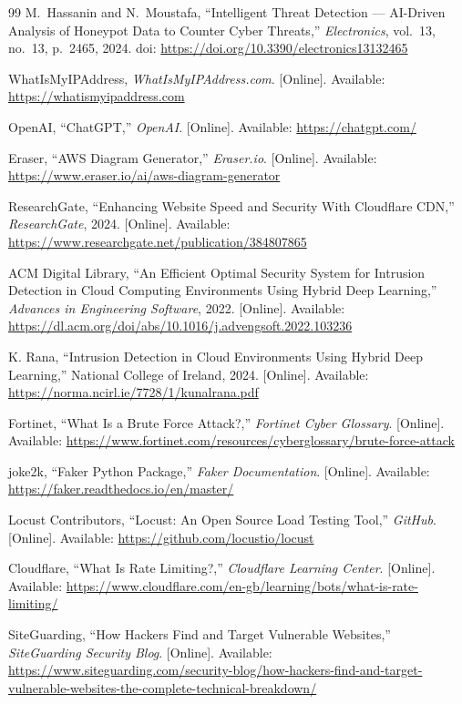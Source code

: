 \documentclass[12pt, a4paper]{report}   %
\begin{document}
\begin{thebibliography}{99}
M.~Hassanin and N.~Moustafa,
``Intelligent Threat Detection --- {AI}-Driven Analysis of Honeypot
Data to Counter Cyber Threats,''
\textit{Electronics}, vol.~13, no.~13, p.~2465, 2024.
doi: \url{https://doi.org/10.3390/electronics13132465}

WhatIsMyIPAddress, \textit{WhatIsMyIPAddress.com}. [Online]. Available:
\url{https://whatismyipaddress.com}

OpenAI, ``ChatGPT,'' \textit{OpenAI}. [Online]. Available: \url{https://chatgpt.com/}

Eraser, ``AWS Diagram Generator,'' \textit{Eraser.io}. [Online]. Available:
\url{https://www.eraser.io/ai/aws-diagram-generator}

ResearchGate, ``Enhancing Website Speed and Security With Cloudflare CDN,''
\textit{ResearchGate}, 2024. [Online]. Available:
\url{https://www.researchgate.net/publication/384807865}

ACM Digital Library, ``An Efficient Optimal Security System for Intrusion Detection
in Cloud Computing Environments Using Hybrid Deep Learning,''
\textit{Advances in Engineering Software}, 2022. [Online]. Available:
\url{https://dl.acm.org/doi/abs/10.1016/j.advengsoft.2022.103236}

K. Rana, ``Intrusion Detection in Cloud Environments Using Hybrid Deep Learning,''
National College of Ireland, 2024. [Online]. Available:
\url{https://norma.ncirl.ie/7728/1/kunalrana.pdf}

Fortinet, ``What Is a Brute Force Attack?,'' \textit{Fortinet Cyber Glossary}.
[Online]. Available:
\url{https://www.fortinet.com/resources/cyberglossary/brute-force-attack}

joke2k, ``Faker Python Package,'' \textit{Faker Documentation}. [Online]. Available:
\url{https://faker.readthedocs.io/en/master/}

Locust Contributors, ``Locust: An Open Source Load Testing Tool,'' \textit{GitHub}.
[Online]. Available: \url{https://github.com/locustio/locust}

Cloudflare, ``What Is Rate Limiting?,'' \textit{Cloudflare Learning Center}.
[Online]. Available:
\url{https://www.cloudflare.com/en-gb/learning/bots/what-is-rate-limiting/}

SiteGuarding, ``How Hackers Find and Target Vulnerable Websites,''
\textit{SiteGuarding Security Blog}. [Online]. Available:
\url{https://www.siteguarding.com/security-blog/how-hackers-find-and-target-vulnerable-websites-the-complete-technical-breakdown/}


\end{thebibliography}
\end{document}
